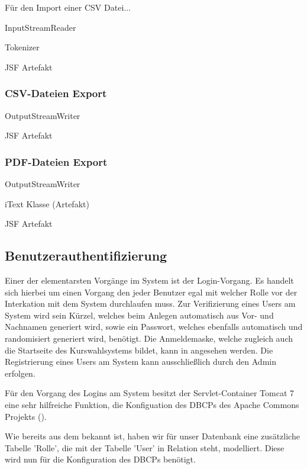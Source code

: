 Für den Import einer CSV Datei...

	InputStreamReader
	
	Tokenizer
	
	JSF Artefakt

\subsubsection{CSV-Dateien Export}

	OutputStreamWriter
	
	JSF Artefakt

\subsubsection{PDF-Dateien Export}

	OutputStreamWriter
	
	iText Klasse (Artefakt)
	
	JSF Artefakt


\subsection{Benutzerauthentifizierung}

Einer der elementarsten Vorgänge im System ist der Login-Vorgang. Es handelt sich hierbei um einen Vorgang den jeder Benutzer egal mit welcher Rolle vor der Interkation mit dem System durchlaufen muss. Zur Verifizierung eines Users am System wird sein Kürzel, welches beim Anlegen automatisch aus Vor- und Nachnamen generiert wird, sowie ein Passwort, welches ebenfalls automatisch und randomisiert generiert wird, benötigt. Die Anmeldemaske, welche zugleich auch die Startseite des Kurswahlsystems bildet, kann in  angesehen werden. Die Registrierung eines Users am System kann ausschließlich durch den Admin erfolgen.

Für den Vorgang des Logins am System besitzt der Servlet-Container Tomcat 7 eine sehr hilfreiche Funktion, die Konfiguation des \ac{DBCP}s des Apache Commons Projekts (\cite{tomcatDBCP}). 

Wie bereits aus dem  bekannt ist, haben wir für unser Datenbank eine zusätzliche Tabelle 'Rolle', die mit der Tabelle 'User' in Relation steht, modelliert. Diese wird nun für die Konfiguration des \ac{DBCP}s benötigt.

